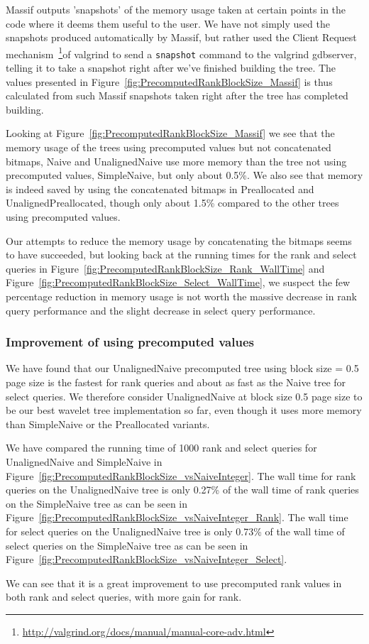 Massif outputs 'snapshots' of the memory usage taken at certain points in the code where it deems them useful to the user.
We have not simply used the snapshots produced automatically by Massif, but rather used the Client Request mechanism~\footnote{\url{http://valgrind.org/docs/manual/manual-core-adv.html}}of valgrind to send a \texttt{snapshot} command to the valgrind gdbserver, telling it to take a snapshot right after we've finished building the tree.
The values presented in Figure~\ref{fig:PrecomputedRankBlockSize_Massif} is thus calculated from such Massif snapshots taken right after the tree has completed building.

Looking at Figure~\ref{fig:PrecomputedRankBlockSize_Massif} we see that the memory usage of the trees using precomputed values but not concatenated bitmaps, Naive and UnalignedNaive use more memory than the tree not using precomputed values, SimpleNaive, but only about 0.5\%.
We also see that memory is indeed saved by using the concatenated bitmaps in Preallocated and UnalignedPreallocated, though only about 1.5\% compared to the other trees using precomputed values.

Our attempts to reduce the memory usage by concatenating the bitmaps seems to have succeeded, but looking back at the running times for the rank and select queries in Figure~\ref{fig:PrecomputedRankBlockSize_Rank_WallTime} and Figure~\ref{fig:PrecomputedRankBlockSize_Select_WallTime}, we suspect the few percentage reduction in memory usage is not worth the massive decrease in rank query performance and the slight decrease in select query performance.


\subsubsection{Improvement of using precomputed values}
We have found that our UnalignedNaive precomputed tree using block size = 0.5 page size is the fastest for rank queries and about as fast as the Naive tree for select queries.
We therefore consider UnalignedNaive at block size 0.5 page size to be our best wavelet tree implementation so far, even though it uses more memory than SimpleNaive or the Preallocated variants.

We have compared the running time of 1000 rank and select queries for UnalignedNaive and SimpleNaive in Figure~\ref{fig:PrecomputedRankBlockSize_vsNaiveInteger}.
The wall time for rank queries on the UnalignedNaive tree is only 0.27\% of the wall time of rank queries on the SimpleNaive tree as can be seen in Figure~\ref{fig:PrecomputedRankBlockSize_vsNaiveInteger_Rank}.
The wall time for select queries on the UnalignedNaive tree is only 0.73\% of the wall time of select queries on the SimpleNaive tree as can be seen in Figure~\ref{fig:PrecomputedRankBlockSize_vsNaiveInteger_Select}.

We can see that it is a great improvement to use precomputed rank values in both rank and select queries, with more gain for rank.

